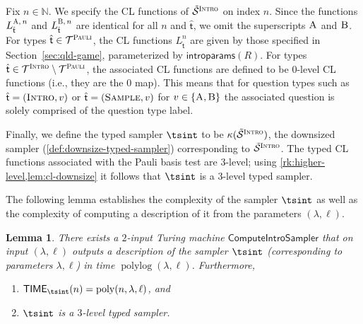 \documentclass[11pt]{article}
\newtheorem{lemma}[theorem]{Lemma}
\theoremstyle{definition}
\newcommand{\N}{\ensuremath{\mathbb{N}}}
\newcommand{\downsize}{\kappa}
\DeclareMathOperator{\poly}{poly}
\DeclareMathOperator{\polylog}{polylog}
\newcommand{\sampler}{\mathcal{S}}
\newcommand{\type}{\mathcal{T}}
\newcommand{\gamestyle}[1]{\ensuremath{\textsc{#1}}\xspace}
\newcommand{\pauli}{\gamestyle{Pauli}}
\newcommand{\intro}{\gamestyle{Intro}}
\newcommand{\labelstyle}[1]{\ensuremath{\textsc{#1}}\xspace}
\newcommand{\tvarstyle}[1]{\mathsf{#1}}
\newcommand{\tvar}{\ensuremath{\tvarstyle{t}}}
\newcommand{\trole}{\ensuremath{v}}
\newcommand{\alice}{\labelstyle{A}}
\newcommand{\bob}{\labelstyle{B}}
\newcommand{\typestyle}[1]{\ensuremath{\textsc{#1}}\xspace}
\newcommand{\Sample}{\typestyle{Sample}}
\newcommand{\Introspect}{\typestyle{Intro}}
\newcommand{\introparams}{\mathsf{introparams}}
\newcommand{\TIME}{\mathsf{TIME}}
\newcommand{\tmstyle}[1]{\ensuremath{\mathsf{#1}}}
\newcommand{\ComputeIntroSampler}{\tmstyle{ComputeIntroSampler}}
\begin{document}
Fix $n \in \N$.
We specify the CL functions of $\tilde{\sampler}^\intro$ on index $n$.
Since the functions $L_{\hat{\tvar}}^{\alice,\, n}$ and
$L_{\hat{\tvar}}^{\bob,\, n}$ are identical for all $n$ and $\hat{\tvar}$, we
omit the superscripts $\alice$ and $\bob$.
For types $\hat{\tvar} \in \type^\pauli$, the CL functions $L_{\hat{\tvar}}^n$
are given by those specified in Section~\ref{sec:qld-game}, parameterized by
$\introparams(R)$.
For types $\hat{\tvar} \in \type^\intro \setminus \type^\pauli$, the associated
CL functions are defined to be $0$-level CL functions (i.e., they are the $0$
map).
This means that for question types such as $\hat{\tvar}=(\Introspect, \trole)$
or $\hat{\tvar}=(\Sample, \trole)$ for $\trole\in\{\alice,\bob\}$ the associated question is solely comprised
of the question type label.

Finally, we define the typed sampler $\tsint$ to be
$\downsize(\tilde{\sampler}^\intro)$, the downsized sampler
(\cref{def:downsize-typed-sampler}) corresponding to $\tilde{\sampler}^\intro$.
The typed CL functions associated with
the Pauli basis test are $3$-level; using \cref{rk:higher-level,lem:cl-downsize}
it follows that $\tsint$ is a $3$-level typed sampler.

The following lemma establishes the complexity of the sampler $\tsint$
as well as the complexity of computing a {description} of it from the parameters
$(\lambda,\ell)$.
\begin{lemma}
  \label{lem:intro-sampler-complexity}
  There exists a $2$-input Turing machine $\ComputeIntroSampler$ that
  on input $(\lambda,\ell)$ outputs a description of the sampler
  $\tsint$ (corresponding to parameters $\lambda,\ell$) in time $\polylog(\lambda,\ell)$.
  Furthermore, 
  \begin{enumerate}
  \item $\TIME_{\tsint}(n) = \poly(n, \lambda, \ell)$, and
	\item $\tsint$  is a $3$-level typed sampler.
  \end{enumerate}
\end{lemma}
\end{document}
